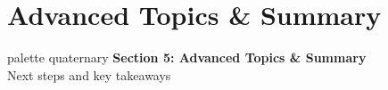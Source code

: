 \documentclass[8pt,aspectratio=169]{beamer}
\begin{document}
\section{Advanced Topics \& Summary}

\begin{frame}{}
\begin{beamercolorbox}[sep=12pt,center,rounded=true,shadow=true]{palette quaternary}
{\Large\bfseries Section 5: Advanced Topics \& Summary}\\[6pt]
{\normalsize Next steps and key takeaways}
\end{beamercolorbox}
\end{frame}
\end{document}
